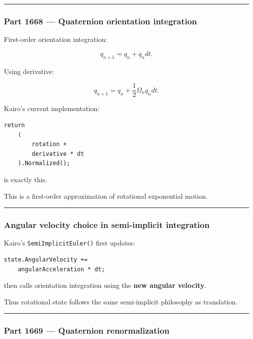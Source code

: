 \begin{center}\rule{0.5\linewidth}{0.5pt}\end{center}

\subsubsection{Part 1668 --- Quaternion orientation integration}\label{part-1668-quaternion-orientation-integration}

First-order orientation integration:

\[
q_{n+1}
=
q_n+
\dot q_n dt.
\]

Using derivative:

\[
\boxed{
q_{n+1}
=
q_n+
\frac12
\Omega_n q_n dt.
}
\]

Kairo's current implementation:

\begin{verbatim}
return
    (
        rotation +
        derivative * dt
    ).Normalized();
\end{verbatim}

is exactly this.

This is a first-order approximation of rotational exponential motion.

\begin{center}\rule{0.5\linewidth}{0.5pt}\end{center}

\subsubsection{Angular velocity choice in semi-implicit integration}\label{angular-velocity-choice-in-semi-implicit-integration}

Kairo's \texttt{SemiImplicitEuler()} first updates:

\begin{verbatim}
state.AngularVelocity +=
    angularAcceleration * dt;
\end{verbatim}

then calls orientation integration using the \textbf{new angular velocity}.

Thus rotational state follows the same semi-implicit philosophy as translation.

\begin{center}\rule{0.5\linewidth}{0.5pt}\end{center}

\subsubsection{Part 1669 --- Quaternion renormalization}\label{part-1669-quaternion-renormalization}

